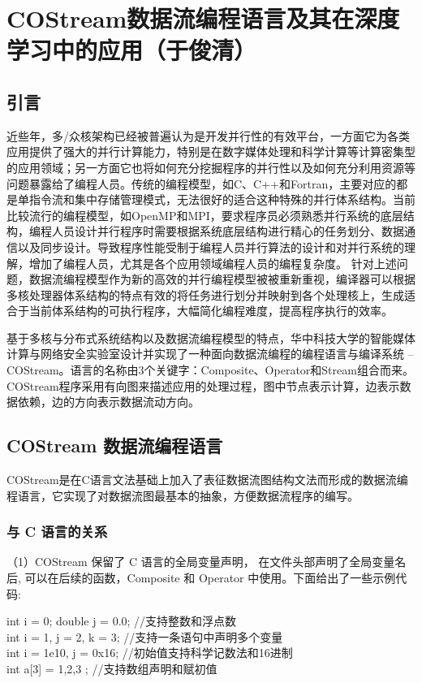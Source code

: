 \section{COStream数据流编程语言及其在深度学习中的应用（于俊清）}
\subsection{引言}
近些年，多/众核架构已经被普遍认为是开发并行性的有效平台，一方面它为各类应用提供了强大的并行计算能力，特别是在数字媒体处理和科学计算等计算密集型的应用领域；另一方面它也将如何充分挖掘程序的并行性以及如何充分利用资源等问题暴露给了编程人员。传统的编程模型，如C、C++和Fortran，主要对应的都是单指令流和集中存储管理模式，无法很好的适合这种特殊的并行体系结构。当前比较流行的编程模型，如OpenMP和MPI，要求程序员必须熟悉并行系统的底层结构，编程人员设计并行程序时需要根据系统底层结构进行精心的任务划分、数据通信以及同步设计。导致程序性能受制于编程人员并行算法的设计和对并行系统的理解，增加了编程人员，尤其是各个应用领域编程人员的编程复杂度。
针对上述问题，数据流编程模型作为新的高效的并行编程模型被被重新重视，编译器可以根据多核处理器体系结构的特点有效的将任务进行划分并映射到各个处理核上，生成适合于当前体系结构的可执行程序，大幅简化编程难度，提高程序执行的效率。

基于多核与分布式系统结构以及数据流编程模型的特点，华中科技大学的智能媒体计算与网络安全实验室设计并实现了一种面向数据流编程的编程语言与编译系统 -- COStream。语言的名称由3个关键字：Composite、Operator和Stream组合而来。COStream程序采用有向图来描述应用的处理过程，图中节点表示计算，边表示数据依赖，边的方向表示数据流动方向。



\subsection{COStream 数据流编程语言}
COStream是在C语言文法基础上加入了表征数据流图结构文法而形成的数据流编程语言，它实现了对数据流图最基本的抽象，方便数据流程序的编写。

\subsubsection{与 C 语言的关系}
（1）COStream 保留了 C 语言的全局变量声明， 在文件头部声明了全局变量名后, 可以在后续的函数，Composite 和 Operator 中使用。下面给出了一些示例代码:
\begin{algorithm}\label{algo:standard}
int i = 0; double j = 0.0; //支持整数和浮点数\\
int i = 1, j = 2, k = 3; //支持一条语句中声明多个变量\\
int i = 1e10, j = 0x16; //初始值支持科学记数法和16进制\\
int a[3] = { 1,2,3 };   //支持数组声明和赋初值
\end{algorithm}

